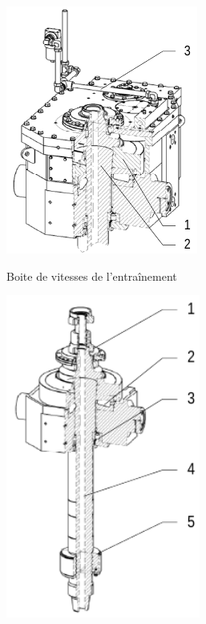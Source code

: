 \begin{figure}[H]
	\centering
	\begin{subfigure}[t]{0.4\textwidth}
         \centering
	 \includegraphics[width=.7\textwidth]{figures/topdrive_drillingunit_drive_gearbox.png}
	 \label{fig:topdrive-drillingunit-drive-gearbox}
	 \caption{Boite de vitesses de l'entraînement}
     \end{subfigure}%
     \begin{subfigure}[t]{0.4\textwidth}
         \centering
 \includegraphics[width=0.7\textwidth]{figures/topdrive_drillingunit_drive_mainshaft.png}

\end{subfigure}
\end{figure}
